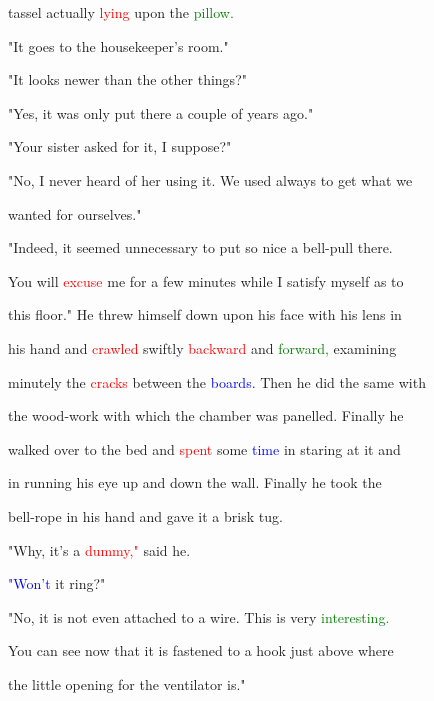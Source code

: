  tassel actually \textcolor{red}{lying} upon the \textcolor{green}{pillow.}



 "It goes to the housekeeper's room."



 "It looks newer than the other things?"



 "Yes, it was only put there a couple of years ago."



 "Your sister asked for it, I suppose?"



 "No, I never heard of her using it. We used always to get what we

 wanted for ourselves."



 "Indeed, it seemed unnecessary to put so nice a bell-pull there.

 You will \textcolor{red}{excuse} me for a few minutes while I satisfy myself as to

 this floor." He threw himself down upon his face with his lens in

 his hand and \textcolor{red}{crawled} swiftly \textcolor{red}{backward} and \textcolor{green}{forward,} examining

 minutely the \textcolor{red}{cracks} between the \textcolor{blue}{boards.} Then he did the same with

 the wood-work with which the chamber was panelled. \textcolor{BurntOrange}{Finally} he

 walked over to the bed and \textcolor{red}{spent} some \textcolor{blue}{time} in \textcolor{BurntOrange}{staring} at it and

 in running his eye up and down the wall. \textcolor{BurntOrange}{Finally} he took the

 bell-rope in his hand and gave it a brisk tug.



 "Why, it's a \textcolor{red}{dummy,"} said he.



 \textcolor{blue}{"Won't} it ring?"



 "No, it is not even attached to a wire. This is very \textcolor{green}{interesting.}

 You can see now that it is fastened to a hook just above where

 the little opening for the ventilator is."



